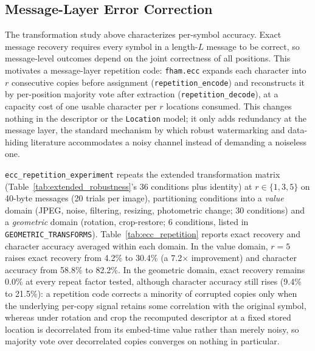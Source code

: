 \documentclass[preprint,12pt]{elsarticle}
\theoremstyle{plain}
\begin{document}
\subsection{Message-Layer Error Correction}
\label{sec:ecc}

The transformation study above characterizes per-symbol accuracy. Exact
message recovery requires every symbol in a length-$L$ message to be correct,
so message-level outcomes depend on the joint correctness of all positions.
This motivates a message-layer repetition code: \texttt{fham.ecc} expands
each character into $r$ consecutive copies before assignment
(\texttt{repetition\_encode}) and reconstructs it by per-position majority
vote after extraction (\texttt{repetition\_decode}), at a capacity cost of
one usable character per $r$ locations consumed. This changes nothing in
the descriptor or the \texttt{Location} model; it only adds redundancy at
the message layer, the standard mechanism by which robust watermarking and
data-hiding literature accommodates a noisy channel instead of demanding a
noiseless one.

\texttt{ecc\_repetition\_experiment} repeats the extended transformation
matrix (Table~\ref{tab:extended_robustness}'s 36 conditions plus identity)
at $r \in \{1,3,5\}$ on 40-byte messages (20 trials per image), partitioning
conditions into a \emph{value} domain (JPEG, noise, filtering, resizing,
photometric change; 30 conditions) and a \emph{geometric} domain (rotation,
crop-restore; 6 conditions, listed in \texttt{GEOMETRIC\_TRANSFORMS}).
Table~\ref{tab:ecc_repetition} reports exact recovery and character accuracy
averaged within each domain. In the value domain, $r=5$ raises exact
recovery from 4.2\% to 30.4\% (a 7.2$\times$ improvement) and character
accuracy from 58.8\% to 82.2\%. In the geometric domain, exact recovery
remains 0.0\% at every repeat factor tested, although character accuracy
still rises (9.4\% to 21.5\%): a repetition code corrects a minority of
corrupted copies only when the underlying per-copy signal retains some
correlation with the original symbol, whereas under rotation and crop the
recomputed descriptor at a fixed stored location is decorrelated from its
embed-time value rather than merely noisy, so majority vote over
decorrelated copies converges on nothing in particular.

\begin{table}[!t]
\centering
\caption{Repetition-Code Error Correction: Exact Recovery and Character Accuracy by Domain (40 Bytes, 20 Trials per Image)}
\label{tab:ecc_repetition}
{\scriptsize\setlength{\tabcolsep}{2pt}}
\end{table}
\end{document}
